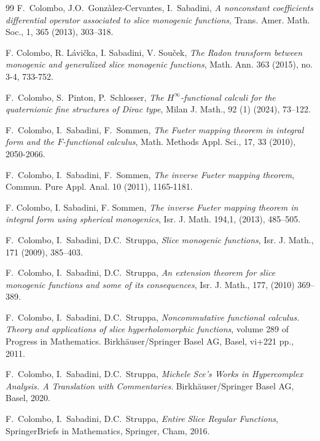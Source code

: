 \documentclass[reqno,11pt]{amsart}
\numberwithin{equation}{section}
\theoremstyle{definition}
\begin{document}
\begin{thebibliography}{99}
	 F.~Colombo, J.O.~Gonzàlez-Cervantes, I.~Sabadini, \emph{A nonconstant coefficients differential operator associated to slice monogenic functions}, Trans. Amer. Math. Soc., 1, 365 (2013), 303–318.
	
	F. Colombo, R. Lávička, I. Sabadini, V. Souček,
	\emph{The Radon transform between monogenic and generalized slice monogenic functions},
	Math. Ann. 363 (2015), no. 3-4, 733-752.
	

	  F.~Colombo, S.~Pinton, P.~Schlosser, \emph{The $H^{\infty}$-functional calculi for the quaternionic fine structures of Dirac type}, Milan J. Math., 92 (1) (2024), 73–122.
	
	 F.~Colombo, I.~Sabadini, F.~Sommen, \emph{ The {F}ueter mapping theorem in integral form and the {$F$}-functional calculus}, Math. Methods Appl. Sci., 17, 33 (2010), 2050-2066.
	
	
	 F.~Colombo, I.~Sabadini,  F.~Sommen, \emph{The inverse {F}ueter mapping theorem},
	Commun. Pure Appl. Anal. 10 (2011), 1165-1181.
	
	 		 	F. Colombo, I. Sabadini, F. Sommen, \emph{The inverse Fueter mapping theorem in integral form using spherical monogenics}, Isr. J. Math. 194,1, (2013), 485–505.
	

	 F.~Colombo, I.~Sabadini, D.C.~Struppa, \emph{Slice monogenic functions}, Isr. J. Math., 171 (2009), 385–403.
	
	 F.~Colombo, I.~Sabadini, D.C.~Struppa, \emph{An extension theorem for slice monogenic functions and some of its consequences}, Isr. J. Math., 177, (2010) 369–389.
	
	   		 F.~Colombo, I.~Sabadini, D.C.~Struppa, \emph{Noncommutative functional calculus. Theory and applications of slice hyperholomorphic functions}, volume {289} of Progress in Mathematics. Birkhäuser/Springer Basel AG, Basel, vi+221 pp., 2011.
	   		
	   		     F.~Colombo, I.~Sabadini, D.C.~Struppa, \emph{Michele Sce's Works in Hypercomplex Analysis. A Translation with Commentaries}. Birkhäuser/Springer Basel AG, Basel, 2020.
	   		
	   		
	
	   		
	   		
	
	 F.~Colombo, I.~Sabadini,  D.C.~Struppa, \emph{Entire Slice Regular Functions}, SpringerBriefs in Mathematics, Springer, Cham, 2016.
	

\end{thebibliography}
\end{document}
